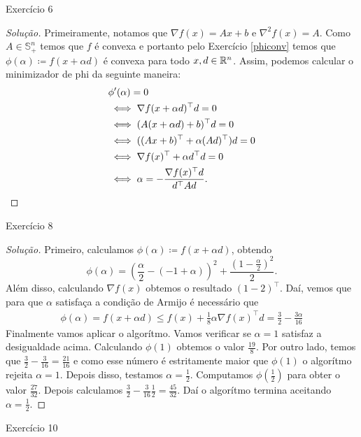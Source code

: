 \documentclass[12pt,twoside,a4paper]{article}
\begin{document}
\begin{problema}\label{alphabuscaex}
Exercício 6  
\end{problema}
\begin{proof}[Solução]
  Primeiramente, notamos que \(\nabla f(x)=Ax + b\) e \(\nabla^2 f(x)=A\).
  Como \(A\in\mathbb{S}^n_+\) temos que \(f\) é convexa e portanto pelo
  Exercício \ref{phiconv} temos que
  \(\phi(\alpha)\coloneqq f(x+ \alpha d)\) é convexa para todo
  \(x,d\in\mathbb{R}^n\). Assim, podemos calcular o minimizador de phi
  da seguinte maneira:
  \begin{align*}
    &\phi^\prime(\alpha)=0\\&
    \iff\nabla f(x+\alpha d)^\top d=0 \\&
    \iff (A(x+\alpha d) + b)^\top d=0 \\&
    \iff ((Ax+b)^\top +\alpha (Ad)^\top)d=0 \\&
    \iff \nabla f(x)^\top +\alpha d^\top d=0 \\&
    \iff \alpha=-\frac{\nabla f(x)^\top d}{d^\top A d}.\qedhere
   \end{align*}
 \end{proof}
 \begin{problema}
 Exercício 8  
\end{problema}
\begin{proof}[Solução]
  Primeiro, calculamos \(\phi(\alpha)\coloneqq f(x+\alpha d)\), obtendo
  \[\phi(\alpha)=(\frac{\alpha}{2}-(-1+\alpha))^2+\frac{(1-\frac{\alpha}{2})^2}{2}.\]
  Além disso, calculando \(\nabla f(x)\) obtemos o resultado \((1 -2)^\top\).
  Daí, vemos que para que \(\alpha\) satisfaça a condição de Armijo é necessário
  que
  \begin{align*}
\phi(\alpha)=f(x+\alpha d)\leq f(x)+\frac{1}{8}\alpha
    \nabla f(x)^\top d =\frac{3}{2}-\frac{3\alpha}{16}
  \end{align*}
 Finalmente vamos aplicar o algorítmo. Vamos verificar se \(\alpha=1\) satisfaz
 a desigualdade acima. Calculando \(\phi(1)\) obtemos o valor \(\frac{19}{8}\).
 Por outro lado, temos que \(\frac{3}{2}-\frac{3}{16}=\frac{21}{16}\) e como
 esse número é estritamente maior que \(\phi(1)\) o algorítmo rejeita
 \(\alpha=1\). Depois disso, testamos \(\alpha=\frac{1}{2}\). Computamos
 \(\phi(\frac{1}{2})\) para obter o valor \(\frac{27}{32}\). Depois calculamos
 \(\frac{3}{2}-\frac{3}{16}\frac{1}{2}=\frac{45}{32}\). Daí o algorítmo termina aceitando \(\alpha=\frac{1}{2}\).
\end{proof}
\begin{problema}
   Exercício 10
\end{problema}
\end{document}

